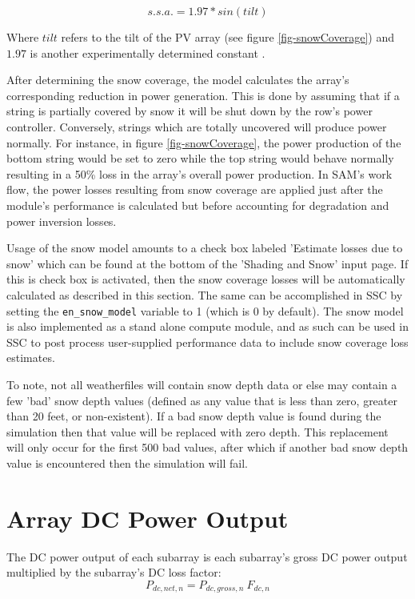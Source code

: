 \documentclass[12pt,letterpaper]{article}
\begin{document}
\begin{equation}
	s.s.a. = 1.97 * sin( tilt )
	\label{eqn-snowSlideAmount}
\end{equation}

Where $tilt$ refers to the tilt of the PV array (see figure \ref{fig-snowCoverage}) and $1.97$ is another experimentally determined constant \citep{marion-snowmodel}.

After determining the snow coverage, the model calculates the array's corresponding reduction in power generation. This is done by assuming that if a string is partially covered by snow it will be shut down by the row's power controller. Conversely, strings which are totally uncovered will produce power normally. For instance, in figure \ref{fig-snowCoverage}, the power production of the bottom string would be set to zero while the top string would behave normally resulting in a 50\% loss in the array's overall power production. In SAM's work flow, the power losses resulting from snow coverage are applied just after the module's performance is calculated but before accounting for degradation and power inversion losses.

Usage of the snow model amounts to a check box labeled 'Estimate losses due to snow' which can be found at the bottom of the 'Shading and Snow' input page. If this is check box is activated, then the snow coverage losses will be automatically calculated as described in this section. The same can be accomplished in SSC by setting the \texttt{en\_snow\_model} variable to 1 (which is 0 by default). The snow model is also implemented as a stand alone compute module, and as such can be used in SSC to post process user-supplied performance data to include snow coverage loss estimates. 

To note, not all weatherfiles will contain snow depth data or else may contain a few 'bad' snow depth values (defined as any value that is less than zero, greater than 20 feet, or non-existent). If a bad snow depth value is found during the simulation then that value will be replaced with zero depth. This replacement will only occur for the first 500 bad values, after which if another bad snow depth value is encountered then the simulation will fail.


\section{Array DC Power Output}

The DC power output of each subarray is each subarray's gross DC power output multiplied by the subarray's DC loss factor:
\begin{equation}
P_{dc,net,n} = P_{dc,gross,n}~F_{dc,n}
\end{equation}
\end{document}
